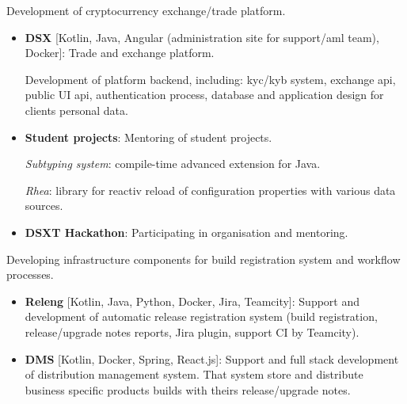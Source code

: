 \documentclass{cv}
\begin{document}
\begin{cvblock}{%
		}

	Development of cryptocurrency exchange/trade platform.

	\begin{itemize}
		\item \textbf{DSX} [Kotlin, Java, Angular (administration site for support/aml team), Docker]: Trade and exchange platform.

		      Development of platform backend, including:
		      kyc/kyb system, exchange api, public UI api, authentication process,
		      database and application design for clients personal data.
		\item \textbf{Student projects}: Mentoring of student projects.

		      \emph{Subtyping system}: compile-time advanced extension for Java.

		      \emph{Rhea}: library for reactiv reload of configuration properties with various data sources.

		\item \textbf{DSXT Hackathon}: Participating in organisation and mentoring.
	\end{itemize}
\end{cvblock}

\begin{cvblock}{%
		}

	Developing infrastructure components for build registration
	system and workflow processes.

	\begin{itemize}
		\item \textbf{Releng} [Kotlin, Java, Python, Docker, Jira, Teamcity]: Support and development of automatic release registration system
		      (build registration, release/upgrade notes reports, Jira plugin,
		      support CI by Teamcity).
		\item \textbf{DMS} [Kotlin, Docker, Spring, React.js]: Support and full stack development of distribution management system. That system store and distribute
		      business specific products builds with theirs release/upgrade notes.
	\end{itemize}
\end{cvblock}
\end{document}
